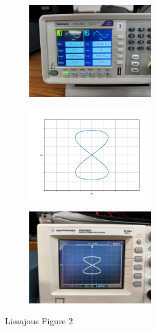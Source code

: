 \documentclass[a4paper,12pt]{article}
\begin{document}
\begin{figure}[h!]
	\begin{subfigure}[b]{10pt}
		\includegraphics[width = 150pt]{figs/fig2.jpeg}
	\end{subfigure}
	\hspace{120pt}
	\begin{subfigure}[b]{10pt}
		\includegraphics[width = 150pt]{figs/fig2.png}
	\end{subfigure}
	\hspace{130pt}
	\begin{subfigure}[b]{10pt}
		\includegraphics[width = 150pt]{figs/fig2_1.jpeg}
	\end{subfigure}
	\caption{Lissajous Figure 2}
\end{figure}
\end{document}
